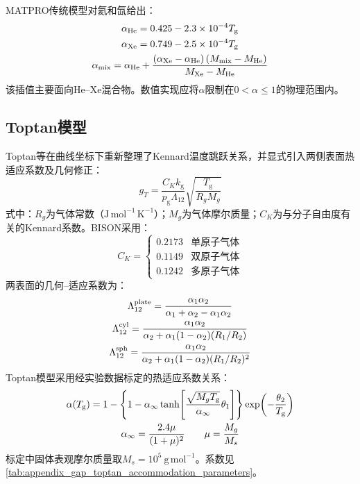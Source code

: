 MATPRO传统模型对氦和氙给出\cite{hagrmanSCDAPRELAP5MOD1995}：
\begin{gather}
	\alpha_{\mathrm{He}}
	=0.425-2.3\times10^{-4}T_{\mathrm g}
	\notag
	\\
	\alpha_{\mathrm{Xe}}
	=0.749-2.5\times10^{-4}T_{\mathrm g}
	\notag
	\\
	\alpha_{\mathrm{mix}}
	=\alpha_{\mathrm{He}}
	+\frac{
		\left(\alpha_{\mathrm{Xe}}-\alpha_{\mathrm{He}}\right)
		\left(M_{\mathrm{mix}}-M_{\mathrm{He}}\right)}
	{M_{\mathrm{Xe}}-M_{\mathrm{He}}}
	\label{eq:appendix_gap_legacy_accommodation}
\end{gather}
该插值主要面向He--Xe混合物。数值实现应将$\alpha$限制在$0<\alpha\leq1$的物理范围内。

\subsection{Toptan模型}

Toptan等在曲线坐标下重新整理了Kennard温度跳跃关系，并显式引入两侧表面热适应系数及几何修正\cite{toptanGapConductanceModeling2019,toptanModelingGapConductance2020}：
\begin{equation}
	g_T
	=\frac{C_K k_{\mathrm g}}{p_{\mathrm g}\Lambda_{12}}
	\sqrt{\frac{T_{\mathrm g}}{R_gM_g}}
	\label{eq:appendix_gap_toptan_jump_distance}
\end{equation}
\noindent 式中：$R_g$为气体常数（$\mathrm{J\,mol^{-1}\,K^{-1}}$）；$M_g$为气体摩尔质量；$C_K$为与分子自由度有关的Kennard系数。BISON采用：
\begin{equation}
	C_K=
	\begin{cases}
		0.2173&\text{单原子气体}\\
		0.1149&\text{双原子气体}\\
		0.1242&\text{多原子气体}
	\end{cases}
	\label{eq:appendix_gap_kennard_coefficients}
\end{equation}
两表面的几何--适应系数为：
\begin{gather}
	\Lambda_{12}^{\mathrm{plate}}
	=\frac{\alpha_1\alpha_2}
	{\alpha_1+\alpha_2-\alpha_1\alpha_2}
	\notag
	\\
	\Lambda_{12}^{\mathrm{cyl}}
	=\frac{\alpha_1\alpha_2}
	{\alpha_2+\alpha_1(1-\alpha_2)(R_1/R_2)}
	\notag
	\\
	\Lambda_{12}^{\mathrm{sph}}
	=\frac{\alpha_1\alpha_2}
	{\alpha_2+\alpha_1(1-\alpha_2)(R_1/R_2)^2}
	\label{eq:appendix_gap_lambda_geometry}
\end{gather}
Toptan模型采用经实验数据标定的热适应系数关系：
\begin{gather}
	\alpha(T_{\mathrm g})
	=1-
	\left\{
	1-\alpha_{\infty}
	\tanh\!\left[
	\frac{\sqrt{M_gT_{\mathrm g}}}{\alpha_{\infty}}\theta_1
	\right]
	\right\}
	\exp\!\left(-\frac{\theta_2}{T_{\mathrm g}}\right)
	\notag
	\\
	\alpha_{\infty}
	=\frac{2.4\mu}{(1+\mu)^2}
	\qquad
	\mu=\frac{M_g}{M_s}
	\label{eq:appendix_gap_toptan_accommodation}
\end{gather}
标定中固体表观摩尔质量取$M_s=10^5\ \mathrm{g\,mol^{-1}}$。系数见\tablename\ref{tab:appendix_gap_toptan_accommodation_parameters}。

